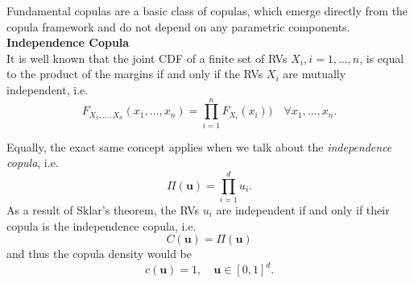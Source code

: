 
Fundamental copulas are a basic class of copulas, which emerge directly from the copula framework and do not depend on any parametric components. \\

\textbf{Independence Copula}\\
It is well known that the joint \ac{CDF} of a finite set of \acp{RV}
$X_i, i = 1, \ldots, n$, is equal to the product of the margins if and only if the \acp{RV} $X_i$ are mutually independent, i.e.
\begin{equation}
F_{X_{1}, \ldots, X_{n}}\left(x_{1}, \ldots, x_{n}\right)= \prod_{i=1}^{n} F_{X_{i}}\left(x_{i}\right)) \quad \forall x_1, \ldots, x_n.
\end{equation}

Equally, the exact same concept applies when we talk about the \textit{independence copula}, i.e.
\begin{equation}
\Pi (\bm{u}) = \prod \limits _{i = 1}^d u_i.
\end{equation}
As a result of Sklar's theorem, the \ac{RV}s $u_i$ are independent if and only if their copula is the independence copula, i.e.
\begin{equation}
 C(\bm{u}) = \Pi (\bm{u}) 
 \end{equation}
and thus the copula density would be 
\begin{equation}
c(\boldsymbol{u})=1, \quad \boldsymbol{u} \in[0,1]^{d}.
\end{equation}


%
%
%
%








